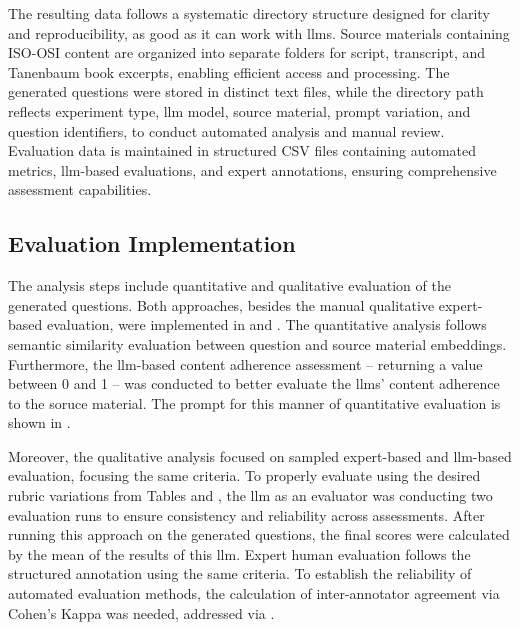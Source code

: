 The resulting data follows a systematic directory structure designed for clarity and reproducibility, as good as it can work with \ac{llms}. Source materials containing ISO-OSI content are organized into separate folders for script, transcript, and Tanenbaum book excerpts, enabling efficient access and processing. The generated questions were stored in distinct text files, while the directory path reflects experiment type, \ac{llm} model, source material, prompt variation, and question identifiers, to conduct automated analysis and manual review. Evaluation data is maintained in structured CSV files containing automated metrics, \ac{llm}-based evaluations, and expert annotations, ensuring comprehensive assessment capabilities.

\subsection{Evaluation Implementation}

The analysis steps include quantitative and qualitative evaluation of the generated questions. Both approaches, besides the manual qualitative expert-based evaluation, were implemented in  and . The quantitative analysis follows semantic similarity evaluation between question and source material embeddings. Furthermore, the \ac{llm}-based content adherence assessment -- returning a value between 0 and 1 -- was conducted to better evaluate the \ac{llms}' content adherence to the soruce material. The prompt for this manner of quantitative evaluation is shown in .

Moreover, the qualitative analysis focused on sampled expert-based and \ac{llm}-based evaluation, focusing the same criteria. To properly evaluate using the desired rubric variations from Tables  and , the \ac{llm} as an evaluator was conducting two evaluation runs to ensure consistency and reliability across assessments. After running this approach on the generated questions, the final scores were calculated by the mean of the results of this \ac{llm}. Expert human evaluation follows the structured annotation using the same criteria. To establish the reliability of automated evaluation methods, the calculation of inter-annotator agreement via Cohen's Kappa was needed, addressed via .

